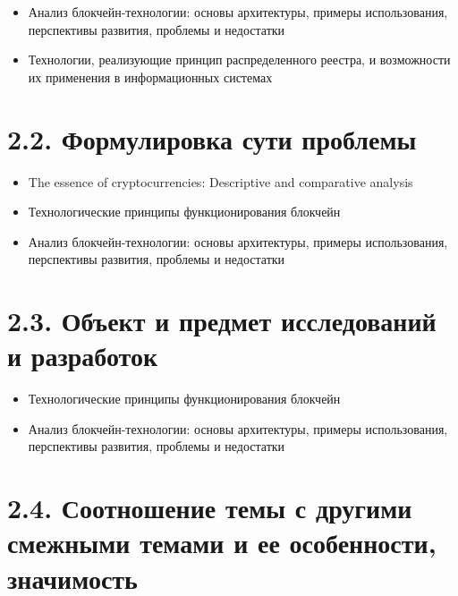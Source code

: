 \documentclass[a4paper, 12pt]{report}		%
\begin{document}
\begin{itemize}
\item Анализ блокчейн-технологии: основы архитектуры, примеры использования, перспективы развития, проблемы и недостатки
\item Технологии, реализующие принцип распределенного реестра, и возможности их применения в информационных системах
\end{itemize}

\section*{2.2. Формулировка сути проблемы}

\begin{itemize}
\item The essence of cryptocurrencies: Descriptive and comparative analysis
\item Технологические принципы функционирования блокчейн
\item Анализ блокчейн-технологии: основы архитектуры, примеры использования, перспективы развития, проблемы и недостатки
\end{itemize}

\section*{2.3. Объект и предмет исследований и разработок}

\begin{itemize}
\item Технологические принципы функционирования блокчейн
\item Анализ блокчейн-технологии: основы архитектуры, примеры использования, перспективы развития, проблемы и недостатки
\end{itemize}

\section*{2.4. Соотношение темы с другими смежными темами и ее особенности, значимость}
\end{document}
